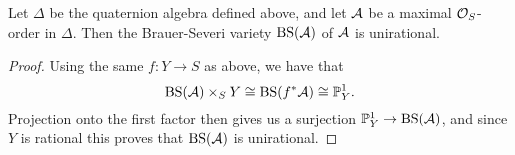 \begin{lem}
Let $\Delta$ be the quaternion algebra defined above, and let $\mathcal{A}$ be a maximal $\mathcal{O}_S$-order in $\Delta$.  Then the Brauer-Severi variety $\textnormal{BS}(\mathcal{A})$ of $\mathcal{A}$ is unirational.
\end{lem}
\begin{proof}
Using the same $f: Y\rightarrow S$ as above, we have that
$$\textnormal{BS}(\mathcal{A})\times_S Y\cong \textnormal{BS}(f^*\mathcal{A}) \cong \mathbb{P}^1_Y.$$
Projection onto the first factor then gives us a surjection $\mathbb{P}^1_Y\rightarrow \textnormal{BS}(\mathcal{A})$, and since $Y$ is rational this proves that $\textnormal{BS}(\mathcal{A})$ is unirational.
\end{proof}
